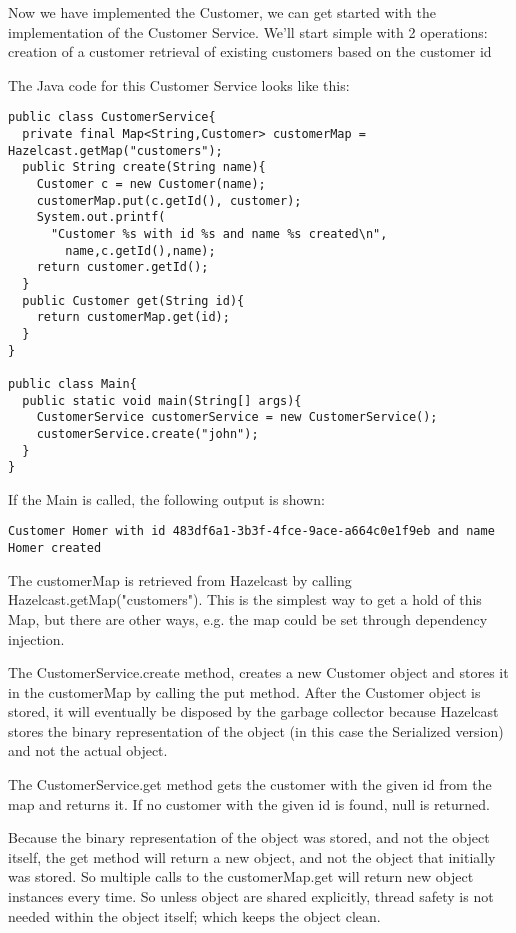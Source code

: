 Now we have implemented the Customer, we can get started with the implementation of the Customer Service. We'll start simple with 2 operations:
creation of a customer
retrieval of existing customers based on the customer id

The Java code for this Customer Service looks like this:

\begin{verbatim}
public class CustomerService{
  private final Map<String,Customer> customerMap = Hazelcast.getMap("customers");
  public String create(String name){
    Customer c = new Customer(name);
    customerMap.put(c.getId(), customer);
    System.out.printf(
      "Customer %s with id %s and name %s created\n",
        name,c.getId(),name);
    return customer.getId();
  }
  public Customer get(String id){
    return customerMap.get(id);
  } 
}

public class Main{
  public static void main(String[] args){
    CustomerService customerService = new CustomerService();
    customerService.create("john");
  }
}
\end{verbatim}

If the Main is called,  the following output is shown:
\begin{verbatim}
Customer Homer with id 483df6a1-3b3f-4fce-9ace-a664c0e1f9eb and name Homer created
\end{verbatim}	

The customerMap is retrieved from Hazelcast by calling Hazelcast.getMap("customers"). This is the simplest way to get a hold of this Map, but there are other ways, e.g. the map could be set through dependency injection.

The CustomerService.create method, creates a new Customer object and stores it in the customerMap by calling the put method. After the Customer object is stored, it will eventually be disposed by the garbage collector because Hazelcast stores the binary representation of the object (in this case the Serialized version) and not the actual object.

The CustomerService.get method gets the customer with the given id from the map and returns it. If no customer with the given id is found, null is returned. 

Because the binary representation of the object was stored, and not the object itself, the get method will return a new object, and not the object that initially was stored. So multiple calls to the customerMap.get will return new object instances every time. So unless object are shared explicitly, thread safety is not needed within the object itself; which keeps the object clean.
 
